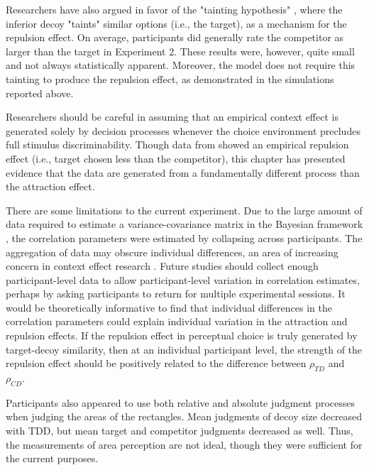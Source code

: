 Researchers have also argued in favor of the "tainting hypothesis" \parencite{simonson2014vices,spektorWhenGoodLooks2018b}, where the inferior decoy "taints" similar options (i.e., the target), as a mechanism for the repulsion effect. On average, participants did generally rate the competitor as larger than the target in Experiment 2. These results were, however, quite small and not always statistically apparent. Moreover, the model does not require this tainting to produce the repulsion effect, as demonstrated in the simulations reported above.

Researchers should be careful in assuming that an empirical context effect is generated solely by decision processes whenever the choice environment precludes full stimulus discriminability. Though data from \textcite{spektorWhenGoodLooks2018b} showed an empirical repulsion effect (i.e., target chosen less than the competitor), this chapter has presented evidence that the data are generated from a fundamentally different process than the attraction effect. 

There are some limitations to the current experiment. Due to the large amount of data required to estimate a variance-covariance matrix in the Bayesian framework \parencite{martin2021,merkle2023opaque}, the correlation parameters were estimated by collapsing across participants. The aggregation of data may obscure individual differences, an area of increasing concern in context effect research \parencite{liewAppropriacyAveragingStudy2016b,cataldoComparisonProcessAccount2019b,trueblood2015fragile,davis2023illustrated}. Future studies should collect enough participant-level data to allow participant-level variation in correlation estimates, perhaps by asking participants to return for multiple experimental sessions. It would be theoretically informative to find that individual differences in the correlation parameters could explain individual variation in the attraction and repulsion effects. If the repulsion effect in perceptual choice is truly generated by target-decoy similarity, then at an individual participant level, the strength of the repulsion effect should be positively related to the difference between $\rho_{TD}$ and $\rho_{CD}$. 

Participants also appeared to use both relative and absolute judgment processes when judging the areas of the rectangles. Mean judgments of decoy size decreased with TDD, but mean target and competitor judgments decreased as well. Thus, the measurements of area perception are not ideal, though they were sufficient for the current purposes. 

